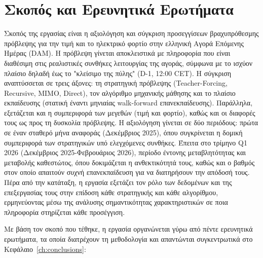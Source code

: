 \section{Σκοπός και Ερευνητικά Ερωτήματα}
\label{sec:purpose}
\label{sec:research_questions}

Σκοπός της εργασίας είναι η αξιολόγηση και σύγκριση προσεγγίσεων βραχυπρόθεσμης πρόβλεψης για την τιμή και το ηλεκτρικό φορτίο στην ελληνική Αγορά Επόμενης Ημέρας (DAM). Η πρόβλεψη γίνεται αποκλειστικά με πληροφορία που είναι διαθέσιμη στις ρεαλιστικές συνθήκες λειτουργίας της αγοράς, σύμφωνα με το ισχύον πλαίσιο δηλαδή έως το "κλείσιμο της πύλης" (D-1, 12:00 CET).
Η σύγκριση αναπτύσσεται σε τρεις άξονες: τη στρατηγική πρόβλεψης (Teacher-Forcing, Recursive, MIMO, Direct), τον αλγόριθμο μηχανικής μάθησης και το πλαίσιο εκπαίδευσης (στατική έναντι μηνιαίας walk-forward επανεκπαίδευσης). Παράλληλα, εξετάζεται και η συμπεριφορά των μεγεθών (τιμή και φορτίο), καθώς και οι διαφορές τους ως προς τη δυσκολία πρόβλεψης.
Η αξιολόγηση γίνεται σε δύο περιόδους: πρώτα σε έναν σταθερό μήνα αναφοράς (Δεκέμβριος 2025), όπου συγκρίνεται η δομική συμπεριφορά των στρατηγικών υπό ελεγχόμενες συνθήκες. Έπειτα στο τρίμηνο Q1 2026 (Δεκέμβριος 2025-Φεβρουάριος 2026), περίοδο έντονης μεταβλητότητας και μεταβολής καθεστώτος, όπου δοκιμάζεται η ανθεκτικότητά τους, καθώς και ο βαθμός στον οποίο απαιτούν συχνή επανεκπαίδευση για να διατηρήσουν την απόδοσή τους.
Πέρα από την κατάταξη, η εργασία εξετάζει τον ρόλο των δεδομένων και της επεξεργασίας τους στην επίδοση κάθε στρατηγικής και κάθε αλγορίθμου, ερμηνεύοντας μέσω της ανάλυσης σημαντικότητας χαρακτηριστικών σε ποια πληροφορία στηρίζεται κάθε προσέγγιση.

Με βάση τον σκοπό που τέθηκε, η εργασία οργανώνεται γύρω από πέντε ερευνητικά
ερωτήματα, τα οποία διατρέχουν τη μεθοδολογία και απαντώνται συγκεντρωτικά στο
Κεφάλαιο~\ref{ch:conclusions}:

